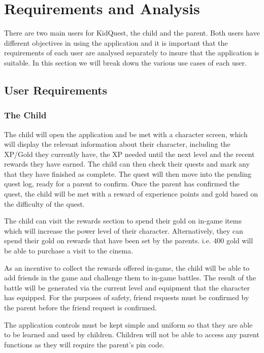 \chapter{Requirements and Analysis}
\label{chap:methodology}

There are two main users for KidQuest, the child and the parent. 
Both users have different objectives in using the application and it is important that the requirements of each user are analysed separately to insure that the application is suitable.
In this section we will break down the various use cases of each user.

\section{User Requirements}

\subsection{The Child}
The child will open the application and be met with a character screen, which will display the relevant information about their character, including the XP/Gold they currently have, the XP needed until the next level and the recent rewards they have earned.
The child can then check their quests and mark any that they have finished as complete.
The quest will then move into the pending quest log, ready for a parent to confirm.
Once the parent has confirmed the quest, the child will be met with a reward of experience points and gold based on the difficulty of the quest.

The child can visit the rewards section to spend their gold on in-game items which will increase the power level of their character. 
Alternatively, they can spend their gold on rewards that have been set by the parents. 
i.e. 400 gold will be able to purchase a visit to the cinema.

As an incentive to collect the rewards offered in-game, the child will be able to add friends in the game and challenge them to in-game battles. 
The result of the battle will be generated via the current level and equipment that the character has equipped. 
For the purposes of safety, friend requests must be confirmed by the parent before the friend request is confirmed.

The application controls must be kept simple and uniform so that they are able to be learned and used by children.
Children will not be able to access any parent functions as they will require the parent's pin code. 

